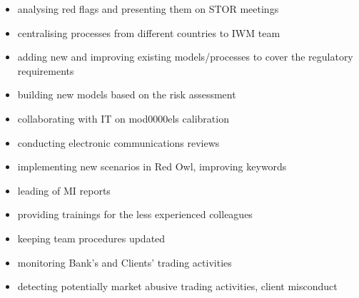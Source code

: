 
\begin{itemize}
	\item analysing red flags and presenting them on STOR meetings
	\item centralising processes from different countries to IWM team
	\item adding new and improving existing models/processes to cover the regulatory requirements
	\item building new models based on the risk assessment
	\item collaborating with IT on mod0000els calibration
	\item conducting electronic communications reviews
	\item implementing new scenarios in Red Owl, improving keywords
	\item leading of MI reports
	\item providing trainings for the less experienced colleagues
	\item keeping team procedures updated
\end{itemize}

\divider

\begin{itemize}
	\item monitoring Bank’s and Clients' trading activities
	\item detecting potentially market abusive trading activities, client misconduct
\end{itemize}

\divider


\divider


\divider

